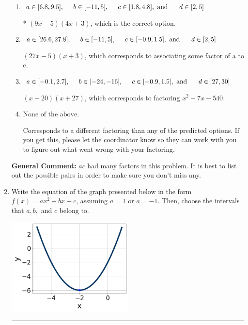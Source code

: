 \documentclass{extbook}[14pt]
\newcommand{\litem}[1]{\item #1

\rule{\textwidth}{0.4pt}}
\begin{document}
\begin{enumerate}
{\begin{enumerate}[label=\Alph*.]
 $(4x -5)(8x + 3)$, which corresponds to associating some factor of c to a.
\item \( a \in [6.8, 9.5], \hspace*{5mm} b \in [-11, 5], \hspace*{5mm} c \in [1.8, 4.8], \text{ and } \hspace*{5mm} d \in [2, 5] \)

* $(9x -5)(4x + 3)$, which is the correct option.
\item \( a \in [26.6, 27.8], \hspace*{5mm} b \in [-11, 5], \hspace*{5mm} c \in [-0.9, 1.5], \text{ and } \hspace*{5mm} d \in [2, 5] \)

 $(27x -5)(x + 3)$, which corresponds to associating some factor of a to c.
\item \( a \in [-0.1, 2.7], \hspace*{5mm} b \in [-24, -16], \hspace*{5mm} c \in [-0.9, 1.5], \text{ and } \hspace*{5mm} d \in [27, 30] \)

 $(x -20)(x + 27)$, which corresponds to factoring $x^{2} +7 x -540$.
\item \( \text{None of the above.} \)

 Corresponds to a different factoring than any of the predicted options. If you get this, please let the coordinator know so they can work with you to figure out what went wrong with your factoring.
\end{enumerate}

\textbf{General Comment:} $ac$ had many factors in this problem. It is best to list out the possible pairs in order to make sure you don't miss any.
}
\litem{
Write the equation of the graph presented below in the form $f(x)=ax^2+bx+c$, assuming  $a=1$ or $a=-1$. Then, choose the intervals that $a, b,$ and $c$ belong to.

\begin{center}
    \includegraphics[width=0.5\textwidth]{../Figures/quadraticGraphToEquationC.png}
\end{center}


}
\end{enumerate}
\end{document}
